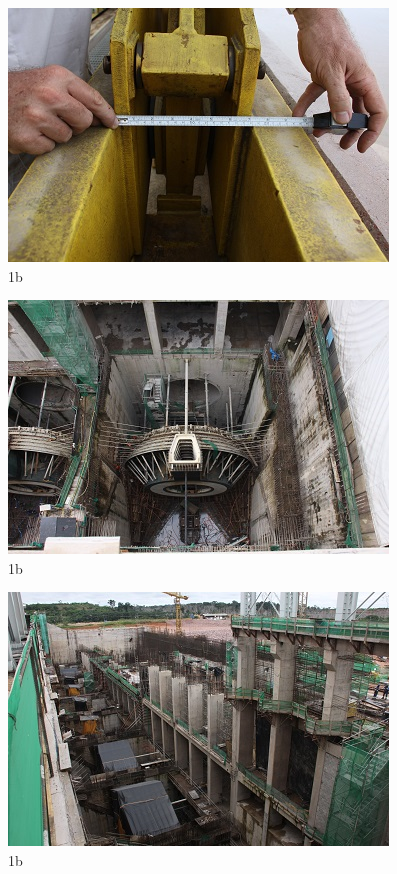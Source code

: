 \begin{figure}[h!]
  \centering
  \includegraphics[width=1\linewidth]{Fotos/Janeiro2015/9.jpg}
  \caption{1b}
  \label{nov20136}
\end{figure}

\begin{figure}[h!]
  \centering
  \includegraphics[width=1\linewidth]{Fotos/Janeiro2015/10.jpg}
  \caption{1b}
  \label{nov20136}
\end{figure}

\begin{figure}[h!]
  \centering
  \includegraphics[width=1\linewidth]{Fotos/Janeiro2015/11.jpg}
  \caption{1b}
  \label{nov20136}
\end{figure}

